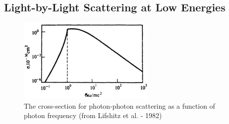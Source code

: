 \documentclass{paper}
\begin{document}
\subsection{Light-by-Light Scattering at Low Energies}%

\begin{figure}[!th]
	\centering
	\includegraphics[width=0.5\linewidth]{figures/photon-photon-scattering.jpg}
	\caption{The cross-section for photon-photon scattering as a function of photon frequency (from Lifshitz et al. - 1982) }
	\label{fig:corss-secction}
\end{figure}
\end{document}
